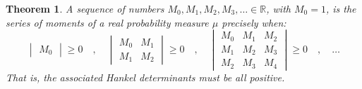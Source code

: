 \documentclass[12pt]{amsbook}
\newtheorem{theorem}{Theorem}[chapter]
\begin{document}
\begin{theorem}
A sequence of numbers $M_0,M_1,M_2,M_3,\ldots\in\mathbb R$, with $M_0=1$, is the series of moments of a real probability measure $\mu$ precisely when:
$$\begin{vmatrix}M_0\end{vmatrix}\geq0\quad,\quad 
\begin{vmatrix}
M_0&M_1\\
M_1&M_2
\end{vmatrix}\geq0\quad,\quad 
\begin{vmatrix}
M_0&M_1&M_2\\
M_1&M_2&M_3\\
M_2&M_3&M_4
\end{vmatrix}\geq0\quad,\quad 
\ldots$$
That is, the associated Hankel determinants must be all positive.
\end{theorem}
\end{document}
